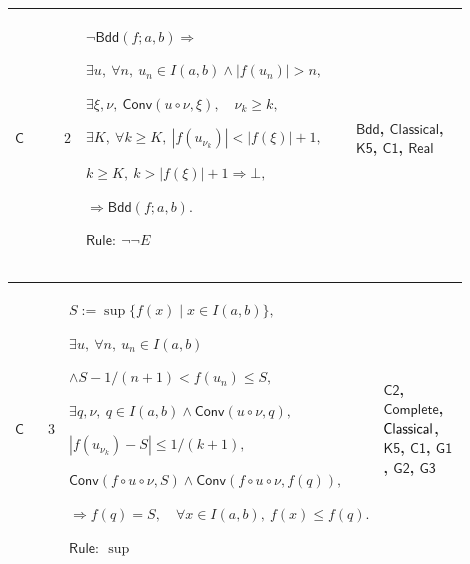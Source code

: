 \documentclass[12pt,reqno]{amsart}
\theoremstyle{blueplain}
\numberwithin{equation}{section}
\begin{document}
{\scriptsize \setlength{\parskip}{0pt}\nointerlineskip
\noindent 
\begin{tabular}{|@{}>{\centering\arraybackslash}m{0.10658\linewidth}|>{\centering\arraybackslash}m{0.03553\linewidth}|>{\centering\arraybackslash}m{0.52105\linewidth}|>{\centering\arraybackslash}m{0.23684\linewidth}|}
\hline
\hypertarget{proof:C2}{$\displaystyle \mathsf{C}$} & $\displaystyle 2$ & $%
\displaystyle \neg\mathsf{Bdd}(f;a,b)\Rightarrow$\par$\displaystyle \exists
u,\ \forall n,\ u_n\in I(a,b)\land|f(u_n)|>n,$\par$\displaystyle %
\exists\xi,\nu,\ \mathsf{Conv}(u\circ\nu,\xi),\quad\nu_k\ge k,$\par$%
\displaystyle \exists K,\ \forall k\ge K,\ |f(u_{\nu_k})|<|f(\xi)|+1,$\par$%
\displaystyle k\ge K,\ k>|f(\xi)|+1\Rightarrow\bot,$\par$\displaystyle %
\Rightarrow\mathsf{Bdd}(f;a,b).$\par$\displaystyle \mathsf{Rule}:\ \neg\neg
E $ & \hyperlink{def:Bdd}{$\displaystyle \mathsf{Bdd}$}, \hyperlink{ax:Classical}%
{$\displaystyle \mathsf{Classical}$}, \hyperlink{proof:K5}{$\displaystyle 
\mathsf{K5}$}, \hyperlink{proof:C1}{$\displaystyle \mathsf{C1}$}, \hyperlink{ax:Real}%
{$\displaystyle \mathsf{Real}$} \\ \hline
\end{tabular}%
}

{\scriptsize \setlength{\parskip}{0pt}\nointerlineskip
\noindent 
\begin{tabular}{|@{}>{\centering\arraybackslash}m{0.10658\linewidth}|>{\centering\arraybackslash}m{0.03553\linewidth}|>{\centering\arraybackslash}m{0.52105\linewidth}|>{\centering\arraybackslash}m{0.23684\linewidth}|}
\hline
\hypertarget{proof:C3}{$\displaystyle \mathsf{C}$} & $\displaystyle 3$ & $%
\displaystyle S:=\sup\{f(x)\mid x\in I(a,b)\},$\par$\displaystyle \exists
u,\ \forall n,\ u_n\in I(a,b)$\par$\displaystyle \land S-1/(n+1)<f(u_n)\le
S, $\par$\displaystyle \exists q,\nu,\ q\in I(a,b)\land\mathsf{Conv}%
(u\circ\nu,q),$\par$\displaystyle |f(u_{\nu_k})-S|\le1/(k+1),$\par$%
\displaystyle \mathsf{Conv}(f\circ u\circ\nu,S)\land\mathsf{Conv}(f\circ
u\circ\nu,f(q)),$\par$\displaystyle \Rightarrow f(q)=S,\quad\forall x\in
I(a,b),\ f(x)\le f(q).$\par$\displaystyle \mathsf{Rule}:\ \sup$ & \hyperlink{proof:C2}%
{$\displaystyle \mathsf{C2}$}, \hyperlink{ax:Complete}{$\displaystyle 
\mathsf{Complete}$}, \hyperlink{ax:Classical}{$\displaystyle \mathsf{%
Classical}$}, \hyperlink{proof:K5}{$\displaystyle \mathsf{K5}$}, \hyperlink{proof:C1}%
{$\displaystyle \mathsf{C1}$}, \hyperlink{proof:G1}{$\displaystyle \mathsf{G1%
}$}, \hyperlink{proof:G2}{$\displaystyle \mathsf{G2}$}, \hyperlink{proof:G3}{%
$\displaystyle \mathsf{G3}$} \\ \hline
\end{tabular}%
}
\end{document}
